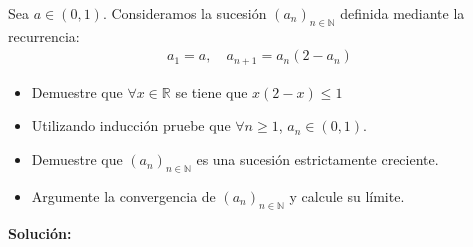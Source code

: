 \documentclass[12pt]{book}
\begin{document}
\begin{prob}{}{}
    Sea $a \in (0,1)$. Consideramos la sucesión $(a_n)_{n \in \mathbb{N}}$ definida mediante la recurrencia:
\begin{align*}
    a_1=a, \quad a_{n+1}=a_n(2-a_n)
\end{align*}
\begin{itemize}
    \item[\textbf{a)}] Demuestre que $\forall x \in \mathbb{R}$ se tiene que $x(2-x) \leq 1$
    \item[\textbf{b)}] Utilizando inducción pruebe que $\forall n \geq 1$, $a_n \in (0,1)$.
    \item[\textbf{c)}] Demuestre que $(a_n)_{n\in \mathbb{N}}$ es una sucesión estrictamente creciente.
    \item[\textbf{d)}] Argumente la convergencia de $(a_n)_{n \in \mathbb{N}}$ y calcule su límite.
\end{itemize}
\end{prob}
\textbf{Solución:}
\end{document}
